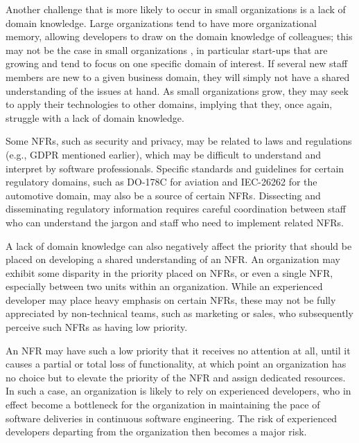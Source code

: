 \documentclass[smallextended]{svjour3}       %
\begin{document}
Another challenge that is more likely to occur in small organizations is a lack of domain knowledge. Large organizations tend to have more organizational memory, allowing developers to draw on the domain knowledge of colleagues; this may not be the case in small organizations \citep{richardson2007guest,sanchez2016understanding}, in particular start-ups that are growing and tend to focus on one specific domain of interest. If several new staff members are new to a given business domain, they will simply not have a shared understanding of the issues at hand.
As small organizations grow, they may seek to apply their technologies to other domains, implying that they, once again, struggle with a lack of domain knowledge. 

Some NFRs, such as security and privacy, may be related to laws and regulations (e.g., GDPR mentioned earlier), which may be difficult to understand and interpret by software professionals. Specific standards and guidelines for certain regulatory domains, such as DO-178C for aviation and IEC-26262 for the automotive domain, may also be a source of certain NFRs.
Dissecting and disseminating regulatory information requires careful coordination between staff who can understand the jargon and staff who need to implement related NFRs. 


A lack of domain knowledge can also negatively affect the priority that should be placed on developing a shared understanding of an NFR.
An organization may exhibit some disparity in the priority placed on NFRs, or even a single NFR, especially between two units within an organization.
While an experienced developer may place heavy emphasis on certain NFRs, these may not be fully appreciated by non-technical teams, such as marketing or sales, who subsequently
perceive such NFRs as having low priority.

An NFR may have such a low priority that it receives no attention at all, until it causes a partial or total loss of functionality, at which point an organization has no choice but to elevate the priority of the NFR and assign dedicated resources. In such a case, an organization is likely to rely on experienced developers, who in effect become a bottleneck for the organization in maintaining the pace of software deliveries in continuous software engineering. The risk of experienced developers departing from the organization then becomes a major risk. 
\end{document}
